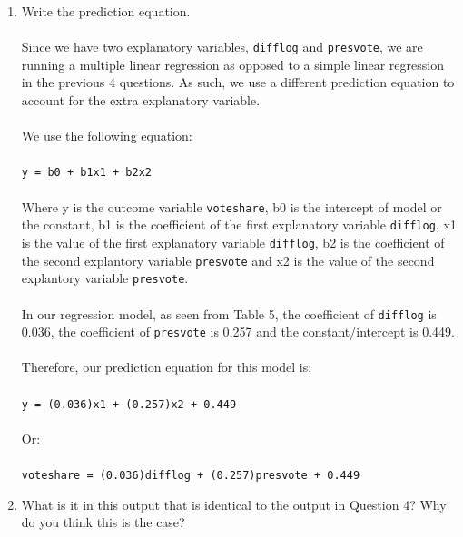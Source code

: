 \documentclass[12pt,letterpaper]{article}
\begin{document}
\begin{enumerate}
\newpage
		\item Write the prediction equation.
\\\\
\noindent Since we have two explanatory variables, \texttt{difflog} and \texttt{presvote}, we are running a multiple linear regression as opposed to a simple linear regression in the previous 4 questions. As such, we use a different prediction equation to account for the extra explanatory variable.
\\\\
\noindent We use the following equation:
\\\\
\noindent \texttt{y = b0 + b1x1 + b2x2}
\\\\
\noindent Where y is the outcome variable \texttt{voteshare}, b0 is the intercept of model or the constant, b1 is the coefficient of the first explanatory variable \texttt{difflog}, x1 is the value of the first explanatory variable \texttt{difflog}, b2 is the coefficient of the second explantory variable \texttt{presvote} and x2 is the value of the second explantory variable \texttt{presvote}.
\\\\
\noindent In our regression model, as seen from Table 5, the coefficient of \texttt{difflog} is 0.036, the coefficient of \texttt{presvote} is 0.257 and the constant/intercept is 0.449.
\\\\
\noindent  Therefore, our prediction equation for this model is:
\\\\
\noindent \texttt{y = (0.036)x1 + (0.257)x2 + 0.449}
\\\\
\noindent Or:
\\\\
\noindent \texttt{voteshare = (0.036)difflog + (0.257)presvote + 0.449}

\vspace{1cm}
\newpage
		\item What is it in this output that is identical to the output in Question 4? Why do you think this is the case?
\\\\


\end{enumerate}
\end{document}

